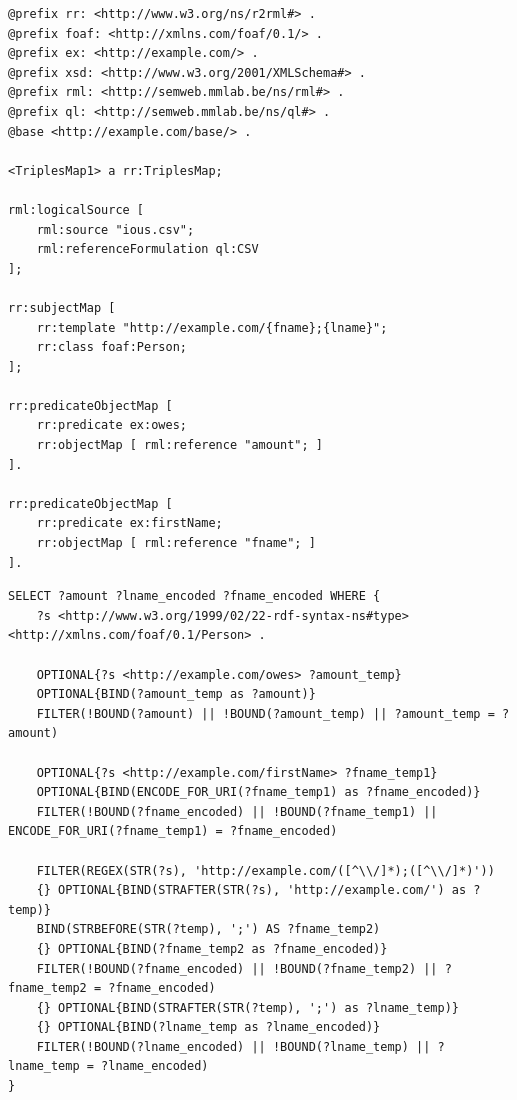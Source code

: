 \begin{lstlisting}[caption={Example mapping rule using all three map types}, label={lst:mapping_rule}, captionpos=b, basicstyle=\small]
@prefix rr: <http://www.w3.org/ns/r2rml#> .
@prefix foaf: <http://xmlns.com/foaf/0.1/> .
@prefix ex: <http://example.com/> .
@prefix xsd: <http://www.w3.org/2001/XMLSchema#> .
@prefix rml: <http://semweb.mmlab.be/ns/rml#> .
@prefix ql: <http://semweb.mmlab.be/ns/ql#> .
@base <http://example.com/base/> .

<TriplesMap1> a rr:TriplesMap;
    
rml:logicalSource [ 
    rml:source "ious.csv";
    rml:referenceFormulation ql:CSV
];

rr:subjectMap [ 
    rr:template "http://example.com/{fname};{lname}";
    rr:class foaf:Person;
];

rr:predicateObjectMap [ 
    rr:predicate ex:owes; 
    rr:objectMap [ rml:reference "amount"; ]
].

rr:predicateObjectMap [ 
    rr:predicate ex:firstName; 
    rr:objectMap [ rml:reference "fname"; ]
].
\end{lstlisting}

\begin{lstlisting}[caption={Generated query for the mapping rule in listing \ref{lst:mapping_rule}}, label={lst:generated_query}, captionpos=b, basicstyle=\small]
SELECT ?amount ?lname_encoded ?fname_encoded WHERE {
    ?s <http://www.w3.org/1999/02/22-rdf-syntax-ns#type> <http://xmlns.com/foaf/0.1/Person> .

    OPTIONAL{?s <http://example.com/owes> ?amount_temp}
    OPTIONAL{BIND(?amount_temp as ?amount)}
    FILTER(!BOUND(?amount) || !BOUND(?amount_temp) || ?amount_temp = ?amount)

    OPTIONAL{?s <http://example.com/firstName> ?fname_temp1}
    OPTIONAL{BIND(ENCODE_FOR_URI(?fname_temp1) as ?fname_encoded)}
    FILTER(!BOUND(?fname_encoded) || !BOUND(?fname_temp1) || ENCODE_FOR_URI(?fname_temp1) = ?fname_encoded)

    FILTER(REGEX(STR(?s), 'http://example.com/([^\\/]*);([^\\/]*)'))
    {} OPTIONAL{BIND(STRAFTER(STR(?s), 'http://example.com/') as ?temp)}
    BIND(STRBEFORE(STR(?temp), ';') AS ?fname_temp2)
    {} OPTIONAL{BIND(?fname_temp2 as ?fname_encoded)}
    FILTER(!BOUND(?fname_encoded) || !BOUND(?fname_temp2) || ?fname_temp2 = ?fname_encoded)
    {} OPTIONAL{BIND(STRAFTER(STR(?temp), ';') as ?lname_temp)}
    {} OPTIONAL{BIND(?lname_temp as ?lname_encoded)}
    FILTER(!BOUND(?lname_encoded) || !BOUND(?lname_temp) || ?lname_temp = ?lname_encoded)
}
\end{lstlisting}

